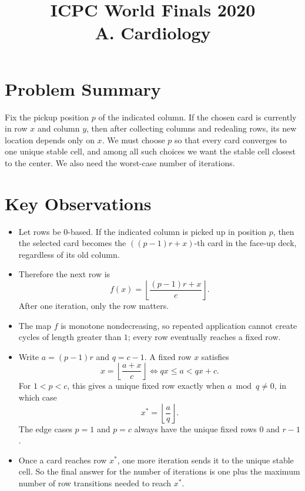 \documentclass[11pt]{article}
\title{ICPC World Finals 2020\\A. Cardiology}
\author{}
\date{}
\begin{document}
\maketitle

\section*{Problem Summary}

Fix the pickup position $p$ of the indicated column. If the chosen card is currently in row $x$ and column
$y$, then after collecting columns and redealing rows, its new location depends only on $x$.
We must choose $p$ so that every card converges to one unique stable cell, and among all such choices
we want the stable cell closest to the center. We also need the worst-case number of iterations.

\section*{Key Observations}

\begin{itemize}[leftmargin=*]
    \item Let rows be $0$-based. If the indicated column is picked up in position $p$, then the selected card
    becomes the $((p-1)r + x)$-th card in the face-up deck, regardless of its old column.
    \item Therefore the next row is
    \[
        f(x) = \left\lfloor \frac{(p-1)r + x}{c} \right\rfloor .
    \]
    After one iteration, only the row matters.
    \item The map $f$ is monotone nondecreasing, so repeated application cannot create cycles of length
    greater than $1$; every row eventually reaches a fixed row.
    \item Write $a = (p-1)r$ and $q = c-1$. A fixed row $x$ satisfies
    \[
        x = \left\lfloor \frac{a + x}{c} \right\rfloor
        \iff qx \le a < qx + c.
    \]
    For $1 < p < c$, this gives a unique fixed row exactly when $a \bmod q \ne 0$, in which case
    \[
        x^* = \left\lfloor \frac{a}{q} \right\rfloor.
    \]
    The edge cases $p=1$ and $p=c$ always have the unique fixed rows $0$ and $r-1$.
    \item Once a card reaches row $x^*$, one more iteration sends it to the unique stable cell. So the final
    answer for the number of iterations is one plus the maximum number of row transitions needed to reach
    $x^*$.
\end{itemize}
\end{document}
